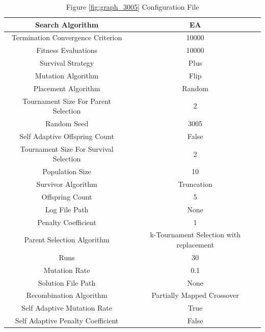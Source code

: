\documentclass{standalone}
\begin{document}
\begin{table}[!htb]
	\centering
	\caption{Figure \ref{fig:graph_3005} Configuration File}
	\label{tab:graph_3005}
	\begin{tabular}{| c | c |}
		\hline
		Search Algorithm		& EA		 \\
		\hline
		Termination Convergence Criterion		& 10000		 \\
		\hline
		Fitness Evaluations		& 10000		 \\
		\hline
		Survival Strategy		& Plus		 \\
		\hline
		Mutation Algorithm		& Flip		 \\
		\hline
		Placement Algorithm		& Random		 \\
		\hline
		Tournament Size For Parent Selection		& 2		 \\
		\hline
		Random Seed		& 3005		 \\
		\hline
		Self Adaptive Offspring Count		& False		 \\
		\hline
		Tournament Size For Survival Selection		& 2		 \\
		\hline
		Population Size		& 10		 \\
		\hline
		Survivor Algorithm		& Truncation		 \\
		\hline
		Offspring Count		& 5		 \\
		\hline
		Log File Path		& None		 \\
		\hline
		Penalty Coefficient		& 1		 \\
		\hline
		Parent Selection Algorithm		& k-Tournament Selection with replacement		 \\
		\hline
		Runs		& 30		 \\
		\hline
		Mutation Rate		& 0.1		 \\
		\hline
		Solution File Path		& None		 \\
		\hline
		Recombination Algorithm		& Partially Mapped Crossover		 \\
		\hline
		Self Adaptive Mutation Rate		& True		 \\
		\hline
		Self Adaptive Penalty Coefficient		& False		 \\
		\hline
	\end{tabular}
\end{table}
\end{document}
